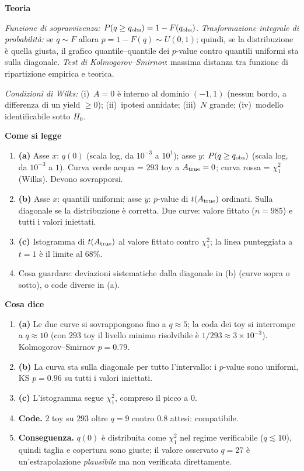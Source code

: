 \documentclass[10.5pt,a4paper]{article}
\newcommand{\sez}[1]{\par\Needspace{6\baselineskip}\medskip\noindent\textbf{\large #1}\par\nopagebreak\smallskip}
\begin{document}
\sez{Teoria}
\emph{Funzione di sopravvivenza:} $P(q\ge q_{\rm obs})=1-F(q_{\rm obs})$. \emph{Trasformazione integrale di probabilità:} se $q\sim F$ allora $p=1-F(q)\sim U(0,1)$; quindi, se la distribuzione è quella giusta, il grafico quantile--quantile dei $p$-value contro quantili uniformi sta sulla diagonale. \emph{Test di Kolmogorov--Smirnov}: massima distanza tra funzione di ripartizione empirica e teorica.

\emph{Condizioni di Wilks:} (i)~$A=0$ è interno al dominio $(-1,1)$ (nessun bordo, a differenza di un yield $\ge0$); (ii)~ipotesi annidate; (iii)~$N$ grande; (iv)~modello identificabile sotto $H_0$.

\sez{Come si legge}
\begin{enumerate}
\item \textbf{(a)} Asse $x$: $q(0)$ (scala log, da $10^{-3}$ a $10^{1}$); asse $y$: $P(q\ge q_{\rm obs})$ (scala log, da $10^{-3}$ a $1$). Curva verde acqua = $293$ toy a $A_{\rm true}=0$; curva rossa = $\chi^2_1$ (Wilks). Devono sovrapporsi.
\item \textbf{(b)} Asse $x$: quantili uniformi; asse $y$: $p$-value di $t(A_{\rm true})$ ordinati. Sulla diagonale se la distribuzione è corretta. Due curve: valore fittato ($n=985$) e tutti i valori iniettati.
\item \textbf{(c)} Istogramma di $t(A_{\rm true})$ al valore fittato contro $\chi^2_1$; la linea punteggiata a $t=1$ è il limite al $68\%$.
\item Cosa guardare: deviazioni sistematiche dalla diagonale in (b) (curve sopra o sotto), o code diverse in (a).
\end{enumerate}

\sez{Cosa dice}
\begin{enumerate}
\item \textbf{(a)} Le due curve si sovrappongono fino a $q\approx5$; la coda dei toy si interrompe a $q\approx10$ (con $293$ toy il livello minimo risolvibile è $1/293\approx3\times10^{-3}$). Kolmogorov--Smirnov $p=0.79$.
\item \textbf{(b)} La curva sta sulla diagonale per tutto l'intervallo: i $p$-value sono uniformi, KS $p=0.96$ su tutti i valori iniettati.
\item \textbf{(c)} L'istogramma segue $\chi^2_1$, compreso il picco a $0$.
\item \textbf{Code.} $2$ toy su $293$ oltre $q=9$ contro $0.8$ attesi: compatibile.
\item \textbf{Conseguenza.} $q(0)$ è distribuita come $\chi^2_1$ nel regime verificabile ($q\lesssim10$), quindi taglia e copertura sono giuste; il valore osservato $q=27$ è un'estrapolazione \emph{plausibile} ma non verificata direttamente.
\end{enumerate}
\end{document}
